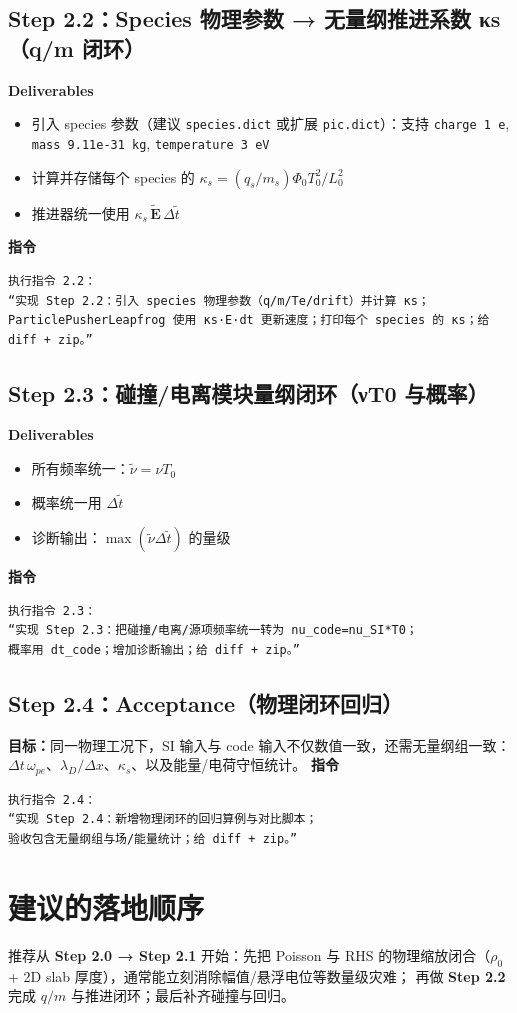 \documentclass[11pt,a4paper]{ctexart}
\begin{document}
\subsection{Step 2.2：Species 物理参数 → 无量纲推进系数 κs（q/m 闭环）}
\textbf{Deliverables}
\begin{itemize}
\item 引入 species 参数（建议 \texttt{species.dict} 或扩展 \texttt{pic.dict}）：支持 \texttt{charge 1 e}, \texttt{mass 9.11e-31 kg}, \texttt{temperature 3 eV}
\item 计算并存储每个 species 的 $\kappa_s=(q_s/m_s)\Phi_0T_0^2/L_0^2$
\item 推进器统一使用 $\kappa_s\,\tilde{\bm{E}}\,\Delta\tilde t$
\end{itemize}
\textbf{指令}
\begin{verbatim}
执行指令 2.2：
“实现 Step 2.2：引入 species 物理参数（q/m/Te/drift）并计算 κs；
ParticlePusherLeapfrog 使用 κs·E·dt 更新速度；打印每个 species 的 κs；给 diff + zip。”
\end{verbatim}

\subsection{Step 2.3：碰撞/电离模块量纲闭环（νT0 与概率）}
\textbf{Deliverables}
\begin{itemize}
\item 所有频率统一：$\tilde{\nu}=\nu T_0$
\item 概率统一用 $\Delta\tilde t$
\item 诊断输出：$\max(\tilde{\nu}\Delta\tilde t)$ 的量级
\end{itemize}
\textbf{指令}
\begin{verbatim}
执行指令 2.3：
“实现 Step 2.3：把碰撞/电离/源项频率统一转为 nu_code=nu_SI*T0；
概率用 dt_code；增加诊断输出；给 diff + zip。”
\end{verbatim}

\subsection{Step 2.4：Acceptance（物理闭环回归）}
\textbf{目标：}同一物理工况下，SI 输入与 code 输入不仅数值一致，还需无量纲组一致：
$\Delta t\,\omega_{pe}$、$\lambda_D/\Delta x$、$\kappa_s$、以及能量/电荷守恒统计。
\textbf{指令}
\begin{verbatim}
执行指令 2.4：
“实现 Step 2.4：新增物理闭环的回归算例与对比脚本；
验收包含无量纲组与场/能量统计；给 diff + zip。”
\end{verbatim}

\section{建议的落地顺序}
推荐从 \textbf{Step 2.0 → Step 2.1} 开始：先把 Poisson 与 RHS 的物理缩放闭合（$\rho_0$ + 2D slab 厚度），通常能立刻消除幅值/悬浮电位等数量级灾难；
再做 \textbf{Step 2.2} 完成 $q/m$ 与推进闭环；最后补齐碰撞与回归。
\end{document}
